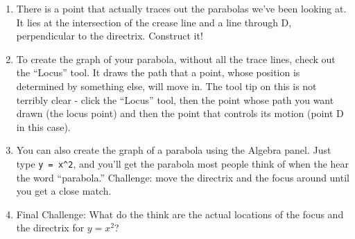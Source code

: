 \begin{enumerate}
\vfill 

\item There is a point that actually traces out the parabolas we've been looking at.  It lies at the intersection of the crease line and a line through D, perpendicular to the directrix.  Construct it!

\vfill

\item To create the graph of your parabola, without all the trace lines, check out the ``Locus'' tool.  It draws the path that a point, whose position is determined by something else, will move in.  The tool tip on this is not terribly clear - click the ``Locus'' tool, then the point whose path you want drawn (the locus point) and then the point that controls its motion (point D in this case).

\vfill

\item You can also create the graph of a parabola using the Algebra panel.  Just type \verb+y = x^2+, and you'll get the parabola most people think of when the hear the word ``parabola.''  Challenge: move the directrix and the focus around until you get a close match.

\vfill

\item Final Challenge: What do the think are the actual locations of the focus and the directrix for $y=x^2$?




\end{enumerate}
